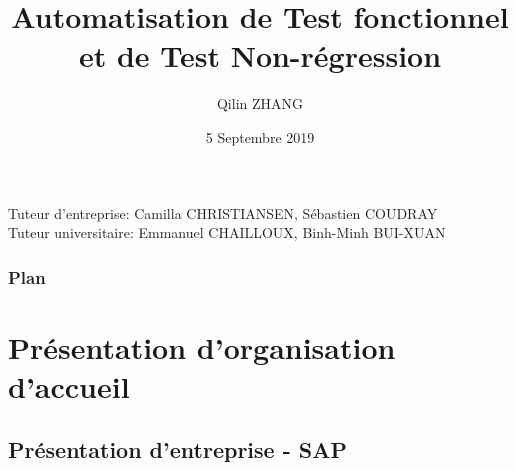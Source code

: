 \documentclass{beamer}
\title[Soutenance de fin d'études]{Automatisation de Test fonctionnel et de Test Non-régression}
\author{Qilin ZHANG}
\institute{Sorbonne Université - Master 2 Informatique STL Alternance}
\date{5 Septembre 2019}
\begin{document}
    \begin{frame}
        
        \titlepage
        \footnotesize Tuteur d'entreprise: Camilla CHRISTIANSEN, Sébastien COUDRAY \\
Tuteur universitaire: Emmanuel CHAILLOUX, Binh-Minh BUI-XUAN
    \end{frame}
    
        
    \begin{frame}
        \frametitle{Plan}
        \tableofcontents
    \end{frame}
    
    \section{Présentation d'organisation d'accueil}
        \subsection{Présentation d'entreprise - SAP}
        
\end{document}
